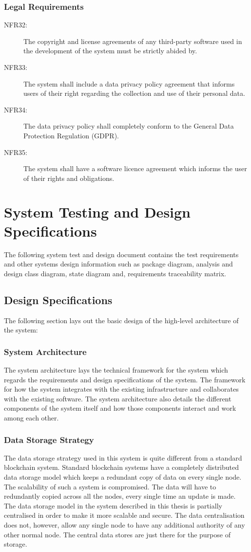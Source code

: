 \documentclass[a4paper,twoside,phd]{BYUPhys}
\begin{document}
\subsection{Legal Requirements}
\begin{description}
\item[NFR32:] The copyright and license agreements of any third-party software used in the development of the system must be strictly abided by.
\item[NFR33:] The system shall include a data privacy policy agreement that informs users of their right regarding the collection and use of their personal data.
\item[NFR34:] The data privacy policy shall completely conform to the General Data Protection Regulation (GDPR).
\item[NFR35:] The system shall have a software licence agreement which informs the user of their rights and obligations.

\end{description}
\chapter{System Testing and Design Specifications}
The following system test and design document contains the test requirements and other systems design information such as package diagram, analysis and design class diagram, state diagram and, requirements traceability matrix.  
\section{Design Specifications}
The following section lays out the basic design of the high-level architecture of the system:
\subsection{System Architecture}
The system architecture lays the technical framework for the system which regards the requirements and design specifications of the system. The framework for how the system integrates with the existing infrastructure and collaborates with the existing software. The system architecture also details the different components of the system itself and how those components interact and work among each other.
\subsection{Data Storage Strategy}
The data storage strategy used in this system is quite different from a standard blockchain system. Standard blockchain systems have a completely distributed data storage model which keeps a redundant copy of data on every single node. The scalability of such a system is compromised. The data will have to redundantly copied across all the nodes, every single time an update is made. The data storage model in the system described in this thesis is partially centralised in order to make it more scalable and secure. The data centralisation does not, however, allow any single node to have any additional authority of any other normal node. The central data stores are just there for the purpose of storage. 
\end{document}
